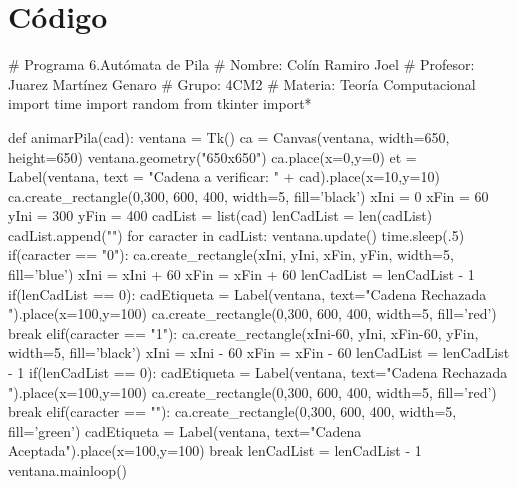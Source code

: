 \documentclass{article}
\begin{document}
	\section*{Código}
	\begin{python}
		# Programa 6.Autómata de Pila
		# Nombre: Colín Ramiro Joel
		# Profesor: Juarez Martínez Genaro
		# Grupo: 4CM2
		# Materia: Teoría Computacional
		import time
		import random
		from tkinter import*
		
		def animarPila(cad):        
			ventana = Tk()
			ca = Canvas(ventana, width=650, height=650) 
			ventana.geometry("650x650")
			ca.place(x=0,y=0)
			et = Label(ventana, text = "Cadena a verificar: " + cad).place(x=10,y=10)
			ca.create_rectangle(0,300, 600, 400, width=5, fill='black')    
			xIni = 0
			xFin = 60
			yIni = 300
			yFin = 400
			cadList = list(cad)
			lenCadList = len(cadList)
			cadList.append("")
			for caracter in cadList:        
				ventana.update()
				time.sleep(.5)        
				if(caracter == "0"):
					ca.create_rectangle(xIni, yIni, xFin, yFin, width=5, fill='blue')
					xIni = xIni + 60
					xFin = xFin + 60 
					lenCadList = lenCadList - 1 
					if(lenCadList == 0):
						cadEtiqueta = Label(ventana, text="Cadena Rechazada \n").place(x=100,y=100)  
						ca.create_rectangle(0,300, 600, 400, width=5, fill='red')
					break 
				elif(caracter == "1"):
					ca.create_rectangle(xIni-60, yIni, xFin-60, yFin, width=5, fill='black')
					xIni = xIni - 60
					xFin = xFin - 60
					lenCadList = lenCadList - 1 
					if(lenCadList == 0):
						cadEtiqueta = Label(ventana, text="Cadena Rechazada \n").place(x=100,y=100)  
						ca.create_rectangle(0,300, 600, 400, width=5, fill='red')
					break
				elif(caracter == ""):
					ca.create_rectangle(0,300, 600, 400, width=5, fill='green')
					cadEtiqueta = Label(ventana, text="Cadena Aceptada\n").place(x=100,y=100)
					break
				lenCadList = lenCadList - 1
			ventana.mainloop()
		

\end{python}
\end{document}
